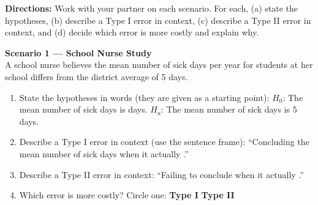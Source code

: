 \documentclass[10pt]{article}
\begin{document}
\namepartnerperiod

\vspace{0.1in}
\textbf{Directions:} Work with your partner on each scenario. For each, (a) state the
hypotheses, (b) describe a Type I error in context, (c) describe a Type II error in
context, and (d) decide which error is more costly and explain why.

\begin{tcolorbox}[colback=white, colframe=black!40, title=\textbf{Tier R --- Remediate},
    fonttitle=\bfseries, arc=2mm, left=3mm, right=3mm, top=2mm, bottom=2mm]

\textbf{Scenario 1 --- School Nurse Study}\\
A school nurse believes the mean number of sick days per year for students at her school
differs from the district average of 5 days.

\begin{enumerate}[label=\alph*.]
  \item State the hypotheses in words (they are given as a starting point):
        $H_0$: The mean number of sick days is \blank{3cm} days.
        $H_a$: The mean number of sick days is \blank{4cm} 5 days.

        \vspace{0.05in}

  \item Describe a Type I error in context (use the sentence frame):
        ``Concluding the mean number of sick days \blank{5cm} when it
        actually \blank{5cm}.''

  \item Describe a Type II error in context:
        ``Failing to conclude \blank{5cm} when it actually \blank{5cm}.''

  \item Which error is more costly? Circle one: \quad \textbf{Type I} \quad \textbf{Type II}
\end{enumerate}
\end{tcolorbox}
\end{document}
